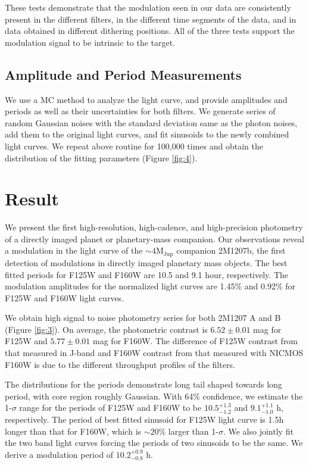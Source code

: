 \documentclass[apj]{emulateapj}
\begin{document}
 These tests demonstrate that the modulation seen in our data are
 consistently present in the different filters, in the different time
 segments of the data, and in data obtained in different dithering
 positions. All of the three tests support the modulation signal to be
 intrinsic to the target. 
 

\subsection{Amplitude and Period Measurements}

We use a MC method to analyze the light curve, and provide amplitudes
and periods as well as their uncertainties for both filters. We
generate series of random Gaussian noises with the standard deviation
same as the photon noises, add them to the original light curves, and
fit sinusoids to the newly combined light curves. We repeat above
routine for 100,000 times and obtain the distribution of the fitting
parameters (Figure \ref{fig:4}).


\section{Result}
\label{Results}

We present the first high-resolution, high-cadence, and high-precision
photometry of a directly imaged planet or planetary-mass
companion. Our observations reveal a modulation in the light curve of
the $\sim 4 \mathrm{M_{{Jup}}}$ companion 2M1207b, the first detection
of modulations in directly imaged planetary mass objects.  The best
fitted periods for F125W and F160W are 10.5 and 9.1 hour,
respectively. The modulation amplitudes for the normalized light
curves are 1.45\% and 0.92\% for F125W and F160W light curves.

We obtain high signal to noise photometry series for both 2M1207 A
and B (Figure \ref{fig:3}). On average, the photometric contrast is
$6.52\pm0.01$ mag for F125W and $5.77\pm0.01$ mag for F160W. The
difference of F125W contrast from that measured in J-band
\citep{Mohanty2007} and F160W contrast from that measured with NICMOS
F160W \citep{Song2006} is due to the different throughput profiles of
the filters.


The distributions for the periods demonstrate long tail shaped towards
long period, with core region roughly Gaussian. With 64\% confidence,
we estimate the 1-$\sigma$ range for the periods of F125W and F160W
to be $10.5_{-1.2}^{+1.3}$ and $9.1_{-1.0}^{+1.1}$ h,
respectively. The period of best fitted sinusoid for F125W light curve
is 1.5h longer than that for F160W, which is $\sim 20\%$ larger than
1-$\sigma$. We also jointly fit the two band light curves forcing the
periods of two sinusoids to be the same. We derive a modulation period of $10.2^{+0.9}_{-0.8}$ h.
\end{document}
